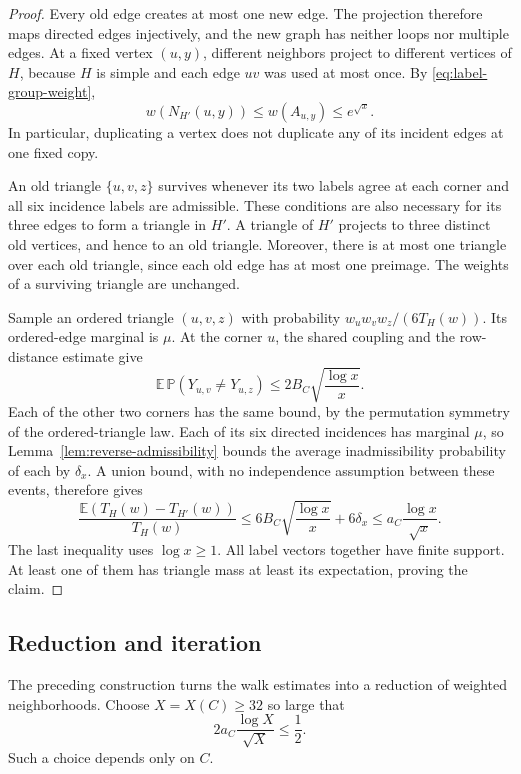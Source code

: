 \documentclass[11pt]{article}
\theoremstyle{definition}
\theoremstyle{remark}
\numberwithin{equation}{section}
\begin{document}
\begin{proof}
Every old edge creates at most one new edge. The projection therefore
maps directed edges injectively, and the new graph has neither loops
nor multiple edges. At a fixed vertex $(u,y)$, different neighbors
project to different vertices of $H$, because $H$ is simple and each
edge $uv$ was used at most once.  By \eqref{eq:label-group-weight},
\[
 w(N_{H'}(u,y))
 \le w(A_{u,y})
 \le e^{\sqrt x}.
\]
In particular, duplicating a vertex does not duplicate any of its
incident edges at one fixed copy.

An old triangle $\{u,v,z\}$ survives whenever its two labels agree
at each corner and all six incidence labels are admissible. These
conditions are also necessary for its three edges to form a triangle
in $H'$. A triangle of $H'$ projects to three distinct old vertices,
and hence to an old triangle. Moreover, there is at most one triangle
over each old triangle, since each old edge has at most one preimage.
The weights of a surviving triangle are unchanged.

Sample an ordered triangle $(u,v,z)$ with probability
$w_uw_vw_z/(6T_H(w))$. Its ordered-edge marginal is $\mu$.
At the corner $u$, the shared coupling and the row-distance estimate
give
\[
 \mathbb E\,\mathbb P(Y_{u,v}\ne Y_{u,z})
 \le 2B_C\sqrt{\frac{\log x}{x}}.
\]
Each of the other two corners has the same bound, by the permutation
symmetry of the ordered-triangle law. Each of its six directed
incidences has marginal $\mu$, so
Lemma~\ref{lem:reverse-admissibility} bounds the average
inadmissibility probability of each by $\delta_x$.
A union bound, with no independence assumption between these events,
therefore gives
\[
 \frac{\mathbb E(T_H(w)-T_{H'}(w))}{T_H(w)}
 \le6B_C\sqrt{\frac{\log x}{x}}+6\delta_x
 \le a_C\frac{\log x}{\sqrt x}.
\]
The last inequality uses $\log x\ge1$. All label vectors together
have finite support. At least one of them has triangle mass at least
its expectation, proving the claim.
\end{proof}

\subsection{Reduction and iteration}

The preceding construction turns the walk estimates into a reduction
of weighted neighborhoods. Choose $X=X(C)\ge32$ so large that
\begin{equation}\label{eq:iteration-threshold}
 2a_C\frac{\log X}{\sqrt X}\le\frac12.
\end{equation}
Such a choice depends only on $C$.
\end{document}
